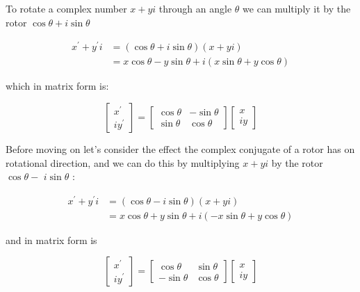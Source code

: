 To rotate a complex number $x+y i$ through an angle $\theta$ we can multiply it by the rotor $\cos \theta+i \sin \theta$

$$
    \begin{aligned}
        x^{\prime}+y^{\prime} i & =(\cos \theta+i \sin \theta)(x+y i)                         \\
                                & =x \cos \theta-y \sin \theta+i(x \sin \theta+y \cos \theta)
    \end{aligned}
$$

which in matrix form is:

$$
    \left[\begin{array}{r}
            x^{\prime} \\
            i y^{\prime}
        \end{array}\right]=\left[\begin{array}{rr}
            \cos \theta & -\sin \theta \\
            \sin \theta & \cos \theta
        \end{array}\right]\left[\begin{array}{c}
            x \\
            i y
        \end{array}\right]
$$

Before moving on let's consider the effect the complex conjugate of a rotor has on rotational direction, and we can do this by multiplying $x+y i$ by the rotor $\cos \theta-$ $i \sin \theta$ :

$$
    \begin{aligned}
        x^{\prime}+y^{\prime} i & =(\cos \theta-i \sin \theta)(x+y i)                          \\
                                & =x \cos \theta+y \sin \theta+i(-x \sin \theta+y \cos \theta)
    \end{aligned}
$$

and in matrix form is

$$
    \left[\begin{array}{r}
            x^{\prime} \\
            i y^{\prime}
        \end{array}\right]=\left[\begin{array}{rr}
            \cos \theta  & \sin \theta \\
            -\sin \theta & \cos \theta
        \end{array}\right]\left[\begin{array}{c}
            x \\
            i y
        \end{array}\right]
$$

